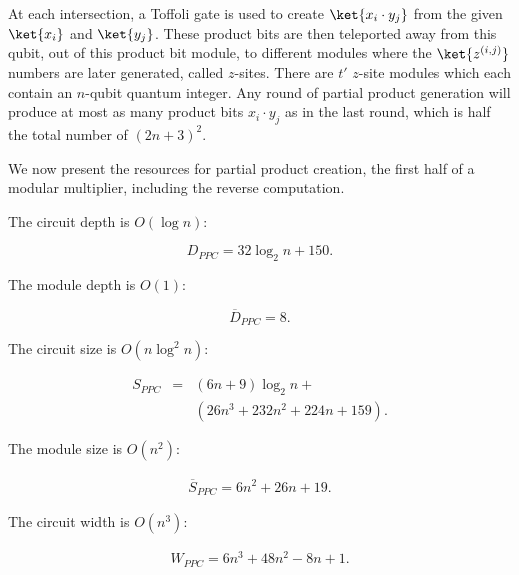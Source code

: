 At each intersection, a Toffoli gate is used to create $\ket{x_i \cdot y_j}$
from the given $\ket{x_i}$ and $\ket{y_j}$. These product bits are then
teleported away from this qubit, out of this product bit module, to different
modules where the $\ket{z^{(i,j)}}$ numbers are later generated,
called $z$-sites. There are $t'$ $z$-site modules which each contain 
an $n$-qubit quantum integer. Any
round of partial product generation will produce at most as many product
bits $x_i \cdot y_j$ as in the last round, which is half the total number
of $(2n+3)^2$.


We now present the resources for partial product creation, the first half of
a modular multiplier, including the reverse computation.

The circuit depth is $O(\log n)$:

\begin{equation}
D_{PPC} = 32\log_2 n + 150\text{.}
\end{equation}

The module depth is $O(1)$:

\begin{equation}
\overline{D}_{PPC} = 8\text{.}
\end{equation}

The circuit size is $O(n\log^2 n)$:

\begin{eqnarray}
S_{PPC} & = & (6n + 9)\log_2 n +\\
        &   & (26n^3 + 232n^2 + 224n + 159)\text{.}
\end{eqnarray}

The module size is $O(n^2)$:

\begin{eqnarray}
\overline{S}_{PPC} = 6n^2 + 26n + 19\text{.}
\end{eqnarray}

The circuit width is $O(n^3)$:

\begin{eqnarray}
W_{PPC} = 6n^3 + 48n^2 - 8n + 1\text{.}
\end{eqnarray}

